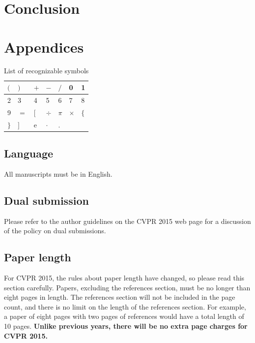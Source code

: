 \documentclass[10pt,twocolumn,letterpaper]{article}
\begin{document}
\section{Conclusion}

{\small


}

\section{Appendices}

\begin{table}[h]
\centering
\label{symbol-list}
\begin{tabular}{|l|l|l|l|l|l|l|}
\hline
$($ & $)$ & $+$ & $-$ & $/$ & 0 & 1 \\ \hline
2 & 3 & 4 & 5 & 6 & 7 & 8 \\ \hline
9 & $=$ & $[$ & $\div$ & $\pi$ & $\times$ & $\{$ \\ \hline
$\}$ & $]$ & e & $\cdot$ & $.$ & & \\
\hline
\end{tabular}
\caption{List of recognizable symbols}
\end{table}



\subsection{Language}

All manuscripts must be in English.

\subsection{Dual submission}

Please refer to the author guidelines on the CVPR 2015 web page for a
discussion of the policy on dual submissions.

\subsection{Paper length}
For CVPR 2015, the rules about paper length have changed, so please
read this section carefully. Papers, excluding the references section,
must be no longer than eight pages in length. The references section
will not be included in the page count, and there is no limit on the
length of the references section. For example, a paper of eight pages
with two pages of references would have a total length of 10 pages.
{\bf Unlike previous years, there will be no extra page charges for
  CVPR 2015.}
\end{document}
